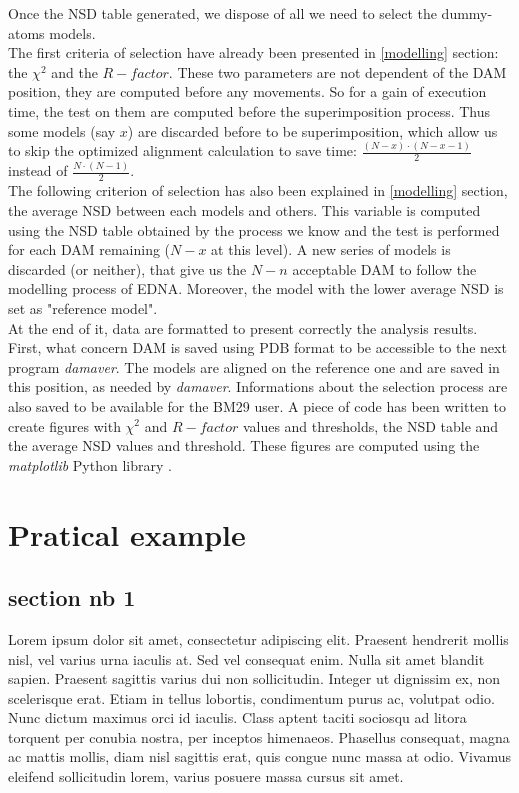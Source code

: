 \documentclass[a4paper, 11pt]{report}
\begin{document}
Once the NSD table generated, we dispose of all we need to select the 
dummy-atoms models.\\
The first criteria of selection have already been presented in 
\ref{modelling} section: the $\chi^2$ and the $R-factor$. 
These two parameters are not dependent of the DAM position, they are 
computed before any movements. 
So for a gain of execution time, the test on them are computed before 
the superimposition process. 
Thus some models (say $x$) are discarded before to be superimposition, 
which allow us to skip the optimized alignment calculation to save 
time: $\frac{(N-x) \cdot (N-x-1)}{2}$ instead of 
$\frac{N \cdot (N-1)}{2}$.\\
The following criterion of selection has also been explained in 
\ref{modelling} section, the average NSD between each models and 
others. 
This variable is computed using the NSD table obtained by the process 
we know and the test is performed for each DAM remaining ($N-x$ at 
this level). 
A new series of models is discarded (or neither), that give us the 
$N-n$ acceptable DAM to follow the modelling process of EDNA. 
Moreover, the model with the lower average NSD is set as "reference 
model".\\

At the end of it, data are formatted to present correctly the analysis 
results. 
First, what concern DAM is saved using PDB format to be accessible to 
the next program \textit{damaver}. 
The models are aligned on the reference one and are saved in this 
position, as needed by \textit{damaver}. 
Informations about the selection process are also saved to be 
available for the BM29 user. 
A piece of code has been written to create figures with $\chi^2$ and 
$R-factor$ values and thresholds, the NSD table and the average NSD 
values and threshold. 
These figures are computed using the \textit{matplotlib} Python 
library \cite{matplotlib}.



\chapter{Pratical example}%


\section{section nb 1}

Lorem ipsum dolor sit amet, consectetur adipiscing elit.
Praesent hendrerit mollis nisl, vel varius urna iaculis at.
Sed vel consequat enim.
Nulla sit amet blandit sapien.
Praesent sagittis varius dui non sollicitudin.
Integer ut dignissim ex, non scelerisque erat.
Etiam in tellus lobortis, condimentum purus ac, volutpat odio.
Nunc dictum maximus orci id iaculis.
Class aptent taciti sociosqu ad litora torquent per conubia nostra, 
per inceptos himenaeos.
Phasellus consequat, magna ac mattis mollis, diam nisl sagittis erat, 
quis congue nunc massa at odio.
Vivamus eleifend sollicitudin lorem, varius posuere massa cursus sit 
amet.
\end{document}
